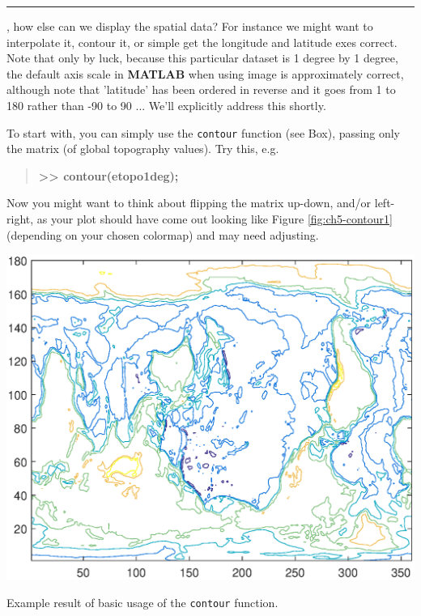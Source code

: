 \documentclass{tufte-book} %
\newenvironment{docspecbold}{\begin{quotation}\ttfamily\bfseries\parskip0pt\parindent0pt\ignorespaces}{\end{quotation}}
\begin{document}

\vspace{1mm}
\noindent\rule{4cm}{0.5pt}
\vspace{-2mm}


, how else can we display the spatial data? For instance we might want to interpolate it, contour it, or simple get the longitude and latitude exes correct. Note that only by luck, because this particular dataset is 1 degree by 1 degree, the default axis scale in \textbf{MATLAB} when using image is approximately correct, although note that 'latitude' has been ordered in reverse and it goes from 1 to 180 rather than -90 to 90 ... We'll explicitly address this shortly.

To start with, you can simply use the \texttt{contour} function (see Box), passing only the matrix (of global topography values). Try this, e.g.
\begin{docspecbold}
>> contour(etopo1deg);
\end{docspecbold}

Now you might want to think about flipping the matrix up-down, and/or left-right, as your plot should have come out looking like Figure \ref{fig:ch5-contour1} (depending on your chosen colormap) and may need adjusting.

\begin{marginfigure}[0.0in]
\includegraphics[width=\linewidth]{ch5-contour1.eps}
\caption{Example result of basic usage of the \texttt{contour} function.}
\label{fig:ch5-contour1}
\end{marginfigure}
\end{document}

